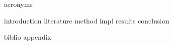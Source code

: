 \documentclass{article}
\begin{document}
{acronyms}

{introduction}
{literature}
{method}
{impl}
{results}
{conclusion}

{biblio}
{appendix}
\end{document}
